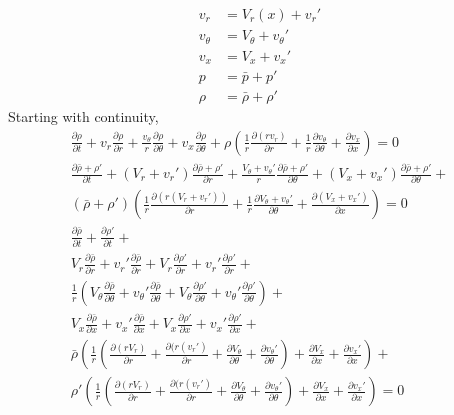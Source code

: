 \documentclass[12pt]{article}
\begin{document}
\begin{align}
v_r 		&= V_r(x) + v_r'\\
v_{\theta} 	&= V_{\theta} + v_{\theta}'\\
v_x 		&= V_x + v_x'\\
p 			&= \bar{p} + p'\\
\rho 		&= \bar{\rho} + \rho'
\end{align}
\newpage
Starting with continuity,
\begin{equation*} 
\end{equation*}
\begin{align*}
\frac{\partial \rho}{\partial t} + 
v_r \frac{\partial \rho}{\partial r} +
\frac{v_{\theta}   }{r}
\frac{\partial \rho}{\partial \theta} +
v_x \frac{\partial \rho}{\partial \theta} + 
\rho 
\left(
\frac{1}{r} \frac{\partial (rv_r)	}{\partial r} +
\frac{1}{r}	\frac{\partial v_{\theta}}{\partial \theta} +
\frac{\partial v_x}{\partial x}
\right) 
= 0\\
\frac{\partial \bar{\rho} + \rho' }{\partial t} +
(V_r + v_r') 
\frac{\partial \bar{\rho} + \rho'}{\partial r} +
\frac{V_{\theta} + v_{\theta}'}{r}
\frac{\partial \bar{\rho} + \rho'}{\partial \theta} +
(V_x + v_x') 
\frac{\partial \bar{\rho} + \rho'}{\partial \theta} + \\ 
(\bar{\rho} + \rho') 
\left(
\frac{1}{r}\frac{\partial (r(V_r +v_r'))}{\partial r} +
\frac{1}{r}\frac{\partial V_{\theta}+v_{\theta}'}{\partial \theta} +
\frac{\partial (V_x + v_x')}{\partial x}
\right) = 0\\
\frac{\partial \bar{\rho}}{\partial t} + 
\frac{\partial \rho'     }{\partial t} +\\
V_r \frac{\partial \bar{\rho}}{\partial r} +  
v_r'\frac{\partial \bar{\rho}}{\partial r} + 
V_r \frac{\partial \rho'}{\partial r} +
v_r'\frac{\partial \rho'}{\partial r} + \\
\frac{1}{r}
\left(
V_{\theta} \frac{\partial \bar{\rho}}{\partial \theta} +
v_{\theta}'\frac{\partial \bar{\rho}}{\partial \theta} + 
V_{\theta} \frac{\partial \rho'		}{\partial \theta} + 
v_{\theta}'\frac{\partial \rho'		}{\partial \theta}
\right) + \\ 
V_x \frac{\partial \bar{\rho}}{\partial x} + 
v_x'\frac{\partial \bar{\rho}}{\partial x} +
V_x \frac{\partial \rho'	 }{\partial x} 	+
v_x'\frac{\partial \rho'    }{\partial x}		+\\
\bar{\rho} 
\left(
\frac{1}{r}
\left(
\frac{\partial (rV_r  )    }{\partial r} +
\frac{\partial (r(v_r')    }{\partial r} +
\frac{\partial V_{\theta}  }{\partial \theta} +
\frac{\partial v_{\theta}' }{\partial \theta}
\right) +
\frac{\partial V_x }{\partial x} +
\frac{\partial v_x'}{\partial x}
\right) + \\
\rho'
\left(
\frac{1}{r}
\left(
\frac{\partial (rV_r  )    }{\partial r} +
\frac{\partial (r(v_r')    }{\partial r} +
\frac{\partial V_{\theta}  }{\partial \theta} +
\frac{\partial v_{\theta}' }{\partial \theta}
\right) +
\frac{\partial V_x }{\partial x} +
\frac{\partial v_x'}{\partial x}
\right)
= 0	\\
\end{align*}
\end{document}
